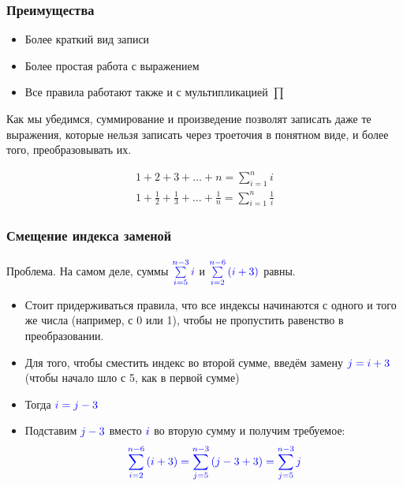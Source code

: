 \begin{frame}[t]
    \frametitle{Преимущества}
    \begin{itemize}
        \item Более краткий вид записи
        \item Более простая работа с выражением 
        \item Все правила работают также и с мультипликацией $\prod$ 
    \end{itemize}
     
    { \color{blue} Как мы убедимся, суммирование и произведение позволят записать даже те выражения, которые нельзя записать через троеточия в понятном виде, и более того, преобразовывать их. }

    \begin{examples}[]
        \begin{gather*}
            1 + 2 + 3 + \dots + n = \sum_{i=1}^{n} i \\
            1 + \frac{1}{2} + \frac{1}{3} + \dots + \frac{1}{n} = \sum_{i=1}^{n} \frac{1}{i}
        \end{gather*}
    \end{examples}
\end{frame}

\begin{frame}[t]
    \frametitle{Смещение индекса заменой}
    \alert{Проблема.} На самом деле, суммы $\color{blue} \sum\limits_{i=5}^{n-3} i$ и $\color{blue} \sum\limits_{i=2}^{n-6} \left( i+3 \right)$ равны. 
    
    \begin{itemize}
        \item Стоит придерживаться правила, что все индексы начинаются с одного и того же числа (например, с 0 или 1), чтобы не пропустить равенство в преобразовании. 
        \item Для того, чтобы сместить индекс во второй сумме, введём замену $\color{blue} j = i+3$ (чтобы начало шло с 5, как в первой сумме)
        \item Тогда $\color{blue} i = j-3$
        \item Подставим $\color{blue} j-3$ вместо $\color{blue} i$ во вторую сумму и получим требуемое: \[
                \color{blue} \sum_{i=2}^{n-6} \left( i+3 \right) = \sum_{j=5}^{n-3} \left( j - 3 + 3 \right) = \sum_{j=5}^{n-3} j
        \] 
    \end{itemize}
\end{frame}

